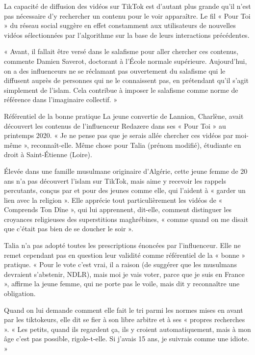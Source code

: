  
La capacité de diffusion des vidéos sur TikTok est d’autant plus grande qu’il n’est pas nécessaire d’y rechercher un contenu pour le voir apparaître. Le fil « Pour Toi » du réseau social suggère en effet constamment aux utilisateurs de nouvelles vidéos sélectionnées par l’algorithme sur la base de leurs interactions précédentes.

 
« Avant, il fallait être versé dans le salafisme pour aller chercher ces contenus, commente Damien Saverot, doctorant à l’École normale supérieure. Aujourd’hui, on a des influenceurs ne se réclamant pas ouvertement du salafisme qui le diffusent auprès de personnes qui ne le connaissent pas, en prétendant qu’il s’agit simplement de l’islam. Cela contribue à imposer le salafisme comme norme de référence dans l’imaginaire collectif. »

Référentiel de la bonne pratique
La jeune convertie de Lannion, Charlène, avait découvert les contenus de l’influenceur Redazere dans ses « Pour Toi » au printemps 2020. « Je ne pense pas que je serais allée chercher ces vidéos par moi-même », reconnaît-elle. Même chose pour Talia (prénom modifié), étudiante en droit à Saint-Étienne (Loire).

Élevée dans une famille musulmane originaire d’Algérie, cette jeune femme de 20 ans n’a pas découvert l’islam sur TikTok, mais aime y recevoir les rappels percutants, conçus par et pour des jeunes comme elle, qui l’aident à « garder un lien avec la religion ». Elle apprécie tout particulièrement les vidéos de « Comprends Ton Dîne », qui lui apprennent, dit-elle, comment distinguer les croyances religieuses des superstitions maghrébines, « comme quand on me disait que c’était pas bien de se doucher le soir ».

 
Talia n’a pas adopté toutes les prescriptions énoncées par l’influenceur. Elle ne remet cependant pas en question leur validité comme référentiel de la « bonne » pratique. « Pour le vote c’est vrai, il a raison (de suggérer que les musulmans devraient s’abstenir, NDLR), mais moi je vais voter, parce que je suis en France », affirme la jeune femme, qui ne porte pas le voile, mais dit y reconnaître une obligation.

Quand on lui demande comment elle fait le tri parmi les normes mises en avant par les tiktokeurs, elle dit se fier à son libre arbitre et à ses « propres recherches ». « Les petits, quand ils regardent ça, ils y croient automatiquement, mais à mon âge c’est pas possible, rigole-t-elle. Si j’avais 15 ans, je suivrais comme une idiote. »

